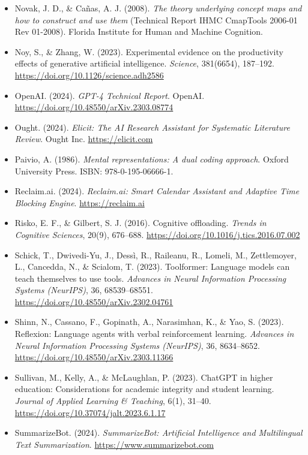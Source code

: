 \begin{itemize}[leftmargin=1.5em, label={}, itemsep=0.22ex, parsep=0pt]
    \item Novak, J. D., \& Ca{\~n}as, A. J. (2008). \textit{The theory underlying concept maps and how to construct and use them} (Technical Report IHMC CmapTools 2006-01 Rev 01-2008). Florida Institute for Human and Machine Cognition.
    \item Noy, S., \& Zhang, W. (2023). Experimental evidence on the productivity effects of generative artificial intelligence. \textit{Science}, 381(6654), 187--192. \url{https://doi.org/10.1126/science.adh2586}
    \item OpenAI. (2024). \textit{GPT-4 Technical Report}. OpenAI. \url{https://doi.org/10.48550/arXiv.2303.08774}
    \item Ought. (2024). \textit{Elicit: The AI Research Assistant for Systematic Literature Review}. Ought Inc. \url{https://elicit.com}
    \item Paivio, A. (1986). \textit{Mental representations: A dual coding approach}. Oxford University Press. ISBN: 978-0-195-06666-1.
    \item Reclaim.ai. (2024). \textit{Reclaim.ai: Smart Calendar Assistant and Adaptive Time Blocking Engine}. \url{https://reclaim.ai}
    \item Risko, E. F., \& Gilbert, S. J. (2016). Cognitive offloading. \textit{Trends in Cognitive Sciences}, 20(9), 676--688. \url{https://doi.org/10.1016/j.tics.2016.07.002}
    \item Schick, T., Dwivedi-Yu, J., Dess{\`i}, R., Raileanu, R., Lomeli, M., Zettlemoyer, L., Cancedda, N., \& Scialom, T. (2023). Toolformer: Language models can teach themselves to use tools. \textit{Advances in Neural Information Processing Systems (NeurIPS)}, 36, 68539--68551. \url{https://doi.org/10.48550/arXiv.2302.04761}
    \item Shinn, N., Cassano, F., Gopinath, A., Narasimhan, K., \& Yao, S. (2023). Reflexion: Language agents with verbal reinforcement learning. \textit{Advances in Neural Information Processing Systems (NeurIPS)}, 36, 8634--8652. \url{https://doi.org/10.48550/arXiv.2303.11366}
    \item Sullivan, M., Kelly, A., \& McLaughlan, P. (2023). ChatGPT in higher education: Considerations for academic integrity and student learning. \textit{Journal of Applied Learning \& Teaching}, 6(1), 31--40. \url{https://doi.org/10.37074/jalt.2023.6.1.17}
    \item SummarizeBot. (2024). \textit{SummarizeBot: Artificial Intelligence and Multilingual Text Summarization}. \url{https://www.summarizebot.com}

\end{itemize}
